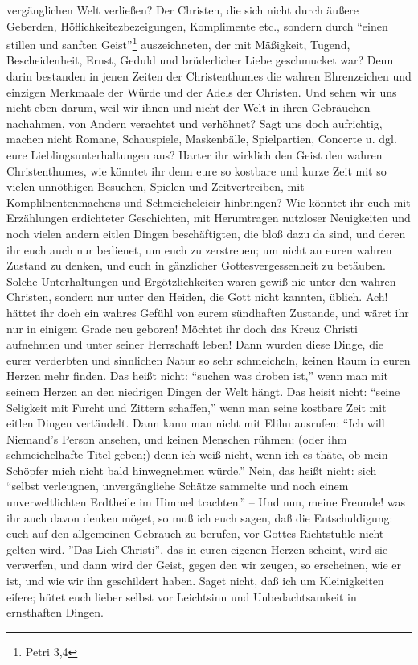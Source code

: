 vergänglichen Welt verließen? Der Christen, die sich nicht durch äußere Geberden, Höflichkeitezbezeigungen, Komplimente etc., sondern durch "`einen stillen und sanften Geist"'\footnote{Petri 3,4} auszeichneten, der mit Mäßigkeit, Tugend, Bescheidenheit, Ernst, Geduld und brüderlicher Liebe geschmucket war? Denn darin bestanden in jenen Zeiten der Christenthumes die wahren Ehrenzeichen und einzigen Merkmaale der Würde und der Adels der Christen. Und sehen wir uns nicht eben darum, weil wir ihnen und nicht der Welt in ihren Gebräuchen nachahmen, von Andern verachtet und verhöhnet? Sagt uns doch aufrichtig, machen nicht Romane, Schauspiele, Maskenbälle, Spielpartien, Concerte u. dgl. eure Lieblingsunterhaltungen aus? Harter ihr wirklich den Geist den wahren Christenthumes, wie könntet ihr denn eure so kostbare und kurze Zeit mit so vielen unnöthigen Besuchen, Spielen und Zeitvertreiben, mit Komplilnentenmachens und Schmeicheleieir hinbringen? Wie könntet ihr euch mit Erzählungen erdichteter Geschichten, mit Herumtragen nutzloser Neuigkeiten und noch vielen andern eitlen Dingen beschäftigten, die bloß dazu da sind, und deren ihr euch auch nur bedienet, um euch zu zerstreuen; um nicht an euren wahren Zustand zu denken, und euch in gänzlicher Gottesvergessenheit zu betäuben. Solche Unterhaltungen und Ergötzlichkeiten waren gewiß nie unter den wahren Christen, sondern nur unter den Heiden, die Gott nicht kannten, üblich. Ach! hättet ihr doch ein wahres Gefühl von eurem sündhaften Zustande, und wäret ihr nur in einigem Grade neu geboren! Möchtet ihr doch das Kreuz Christi aufnehmen und unter seiner Herrschaft leben! Dann wurden diese Dinge, die eurer verderbten und sinnlichen Natur so sehr schmeicheln, keinen Raum in euren Herzen mehr finden. Das heißt nicht: "`suchen was droben ist,"'  wenn man mit seinem Herzen an den niedrigen Dingen der Welt hängt. Das heisit nicht: "`seine Seligkeit mit Furcht und Zittern schaffen,"' wenn man seine kostbare Zeit mit eitlen Dingen vertändelt. Dann kann man nicht mit Elihu ausrufen: "`Ich will Niemand's Person ansehen, und keinen Menschen rühmen; (oder ihm schmeichelhafte Titel geben;) denn ich weiß nicht, wenn ich es thäte, ob mein Schöpfer mich nicht bald hinwegnehmen würde."' Nein, das heißt nicht: sich "`selbst verleugnen, unvergängliehe Schätze sammelte und noch einem unverweltlichten Erdtheile im Himmel trachten."' -- Und nun, meine Freunde! was ihr auch davon denken möget, so muß ich euch sagen, daß die Entschuldigung: euch auf den allgemeinen Gebrauch zu berufen, vor Gottes Richtstuhle nicht gelten wird. ''Das Lich Christi'', das in euren eigenen Herzen scheint, wird sie verwerfen, und dann wird der Geist, gegen den wir zeugen, so erscheinen, wie er ist, und wie wir ihn geschildert haben. Saget nicht, daß ich um Kleinigkeiten eifere; hütet euch lieber selbst vor Leichtsinn und Unbedachtsamkeit in ernsthaften Dingen.

